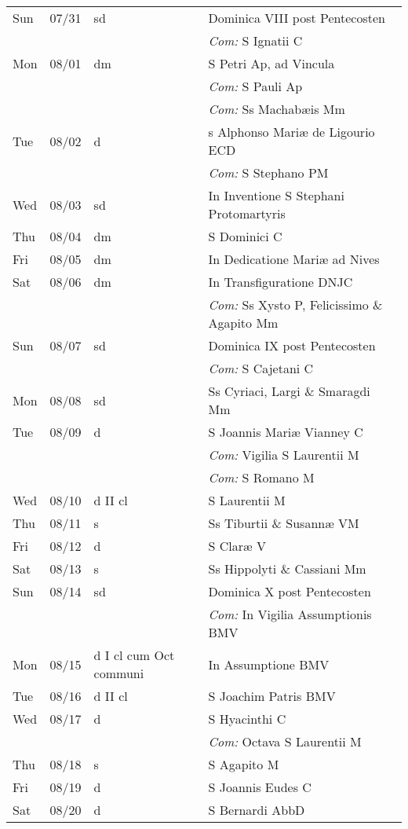 \documentclass[10pt]{article}
\begin{document}
\begin{longtable}{ l l l l }
Sun & 07/31 & sd & Dominica VIII post Pentecosten\\
 & & & \textit{Com:} S Ignatii C\\
Mon & 08/01 & dm & S Petri Ap, ad Vincula\\
 & & & \textit{Com:} S Pauli Ap\\
 & & & \textit{Com:} Ss Machabæis Mm\\
Tue & 08/02 & d & s Alphonso Mariæ de Ligourio ECD\\
 & & & \textit{Com:} S Stephano PM\\
Wed & 08/03 & sd & In Inventione S Stephani Protomartyris\\
Thu & 08/04 & dm & S Dominici C\\
Fri & 08/05 & dm & In Dedicatione Mariæ ad Nives\\
Sat & 08/06 & dm & In Transfiguratione DNJC\\
 & & & \textit{Com:} Ss Xysto P, Felicissimo \& Agapito Mm\\
Sun & 08/07 & sd & Dominica IX post Pentecosten\\
 & & & \textit{Com:} S Cajetani C\\
Mon & 08/08 & sd & Ss Cyriaci, Largi \& Smaragdi Mm\\
Tue & 08/09 & d & S Joannis Mariæ Vianney C\\
 & & & \textit{Com:} Vigilia S Laurentii M\\
 & & & \textit{Com:} S Romano M\\
Wed & 08/10 & d II cl & S Laurentii M\\
Thu & 08/11 & s & Ss Tiburtii \& Susannæ VM\\
Fri & 08/12 & d & S Claræ V\\
Sat & 08/13 & s & Ss Hippolyti \& Cassiani Mm\\
Sun & 08/14 & sd & Dominica X post Pentecosten\\
 & & & \textit{Com:} In Vigilia Assumptionis BMV\\
Mon & 08/15 & d I cl cum Oct communi & In Assumptione BMV\\
Tue & 08/16 & d II cl & S Joachim Patris BMV\\
Wed & 08/17 & d & S Hyacinthi C\\
 & & & \textit{Com:} Octava S Laurentii M\\
Thu & 08/18 & s & S Agapito M\\
Fri & 08/19 & d & S Joannis Eudes C\\
Sat & 08/20 & d & S Bernardi AbbD\\

\end{longtable}
\end{document}
